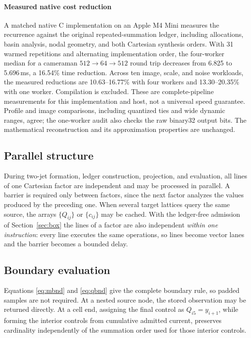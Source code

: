 \documentclass[journal]{IEEEtran}
\begin{document}
\paragraph{Measured native cost reduction}
A matched native C implementation on an Apple M4 Mini measures the recurrence
against the original repeated-summation ledger, including allocations, basin
analysis, nodal geometry, and both Cartesian synthesis orders. With 31 warmed
repetitions and alternating implementation order, the four-worker median for
a cameraman \(512\to64\to512\) round trip decreases from 6.825 to
5.696\,ms, a 16.54\% time reduction. Across ten image, scale, and noise
workloads, the measured reductions are 10.63--16.77\% with four workers
and 13.30--20.35\% with one worker. Compilation is excluded. These are
complete-pipeline measurements for this implementation and host, not a
universal speed guarantee. Profile and image comparisons, including
quantized ties and wide dynamic ranges, agree; the one-worker audit also
checks the raw binary32 output bits. The mathematical reconstruction and
its approximation properties are unchanged.

\subsection{Parallel structure}

During two-jet formation, ledger construction, projection, and evaluation,
all lines of one Cartesian factor are independent and may be processed in
parallel. A barrier is required only between factors, since the next factor
analyzes the values produced by the preceding one. When several target
lattices query the same source, the arrays \(\{Q_{ij}\}\) or
\(\{c_{ij}\}\) may be cached. With the ledger-free admission of
Section~\ref{sec:box} the lines of a factor are also independent
\emph{within one instruction}: every line executes the same operations,
so lines become vector lanes and the barrier becomes a bounded delay.

\subsection{Boundary evaluation}

Equations \eqref{eq:mbnd} and \eqref{eq:qbnd} give the complete boundary
rule, so padded samples are not required. At a nested source node, the stored
observation may be returned directly. At a cell end, assigning the final
control as \(Q_{i5}=y_{i+1}\), while forming the interior controls from
cumulative admitted current, preserves cardinality independently of the
summation order used for those interior controls.
\end{document}
